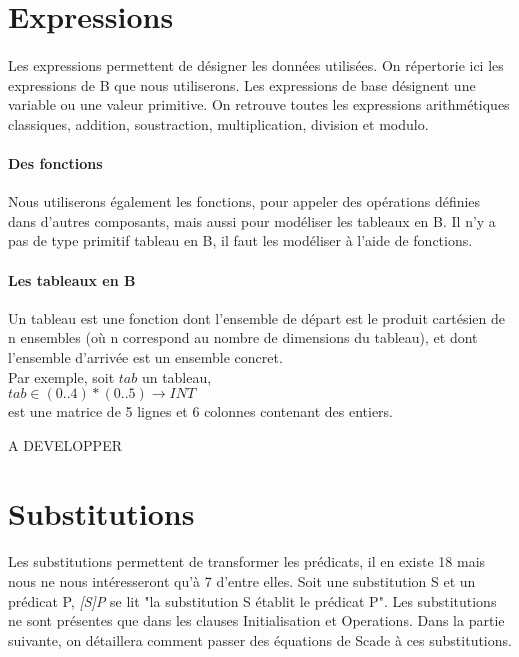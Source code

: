 
\section{Expressions}

\paragraph{}
Les expressions permettent de désigner les données utilisées. On
répertorie ici les expressions de B que nous utiliserons. Les
expressions de base désignent une variable ou une valeur primitive.
On retrouve toutes les expressions arithmétiques classiques, addition,
soustraction, multiplication, division et modulo.

\paragraph{Des fonctions}

Nous utiliserons également les fonctions, pour appeler des opérations
définies dans d'autres composants, mais aussi pour modéliser les
tableaux en B. Il n'y a pas de type primitif tableau en B, il faut les
modéliser à l'aide de fonctions.

\paragraph{Les tableaux en B}
Un tableau est une fonction dont l'ensemble de départ est le produit
cartésien de n ensembles (où n correspond au nombre de dimensions du
tableau), et dont l'ensemble d'arrivée est un ensemble concret.\\
Par exemple, soit $tab$ un tableau, \\
$tab \in (0..4)*(0..5) \rightarrow INT$ \\
est une matrice de 5 lignes et 6 colonnes contenant des entiers.

A DEVELOPPER 




\section{Substitutions}
Les substitutions permettent de transformer les prédicats, il en existe 18 mais
nous ne nous intéresseront qu'à 7 d'entre elles. Soit une substitution S et un
prédicat P, \emph{[S]P} se lit "la substitution S établit le prédicat P".
Les substitutions ne sont présentes que dans les clauses Initialisation et
Operations. Dans la partie suivante, on détaillera comment passer des équations
de Scade à ces substitutions.


